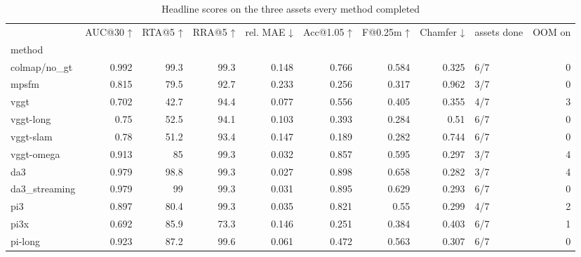 \begin{table}
\caption{Headline scores on the three assets every method completed}
\label{tab:t1_main_results}
\begin{tabular}{lrrrrrrrlr}
\toprule
 & AUC@30 ↑ & RTA@5 ↑ & RRA@5 ↑ & rel. MAE ↓ & Acc@1.05 ↑ & F@0.25m ↑ & Chamfer ↓ & assets done & OOM on \\
method &  &  &  &  &  &  &  &  &  \\
\midrule
colmap/no\_gt & 0.992 & 99.3 & 99.3 & 0.148 & 0.766 & 0.584 & 0.325 & 6/7 & 0 \\
mpsfm & 0.815 & 79.5 & 92.7 & 0.233 & 0.256 & 0.317 & 0.962 & 3/7 & 0 \\
vggt & 0.702 & 42.7 & 94.4 & 0.077 & 0.556 & 0.405 & 0.355 & 4/7 & 3 \\
vggt-long & 0.75 & 52.5 & 94.1 & 0.103 & 0.393 & 0.284 & 0.51 & 6/7 & 0 \\
vggt-slam & 0.78 & 51.2 & 93.4 & 0.147 & 0.189 & 0.282 & 0.744 & 6/7 & 0 \\
vggt-omega & 0.913 & 85 & 99.3 & 0.032 & 0.857 & 0.595 & 0.297 & 3/7 & 4 \\
da3 & 0.979 & 98.8 & 99.3 & 0.027 & 0.898 & 0.658 & 0.282 & 3/7 & 4 \\
da3\_streaming & 0.979 & 99 & 99.3 & 0.031 & 0.895 & 0.629 & 0.293 & 6/7 & 0 \\
pi3 & 0.897 & 80.4 & 99.3 & 0.035 & 0.821 & 0.55 & 0.299 & 4/7 & 2 \\
pi3x & 0.692 & 85.9 & 73.3 & 0.146 & 0.251 & 0.384 & 0.403 & 6/7 & 1 \\
pi-long & 0.923 & 87.2 & 99.6 & 0.061 & 0.472 & 0.563 & 0.307 & 6/7 & 0 \\
\bottomrule
\end{tabular}
\end{table}


